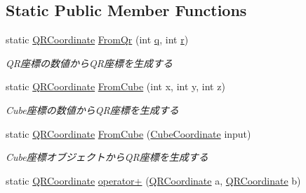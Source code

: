 \subsection*{Static Public Member Functions}
\begin{DoxyCompactItemize}
\item 
static \mbox{\hyperlink{struct_hexagonal_map_1_1_domain_1_1_hex_map_1_1_q_r_coordinate}{Q\+R\+Coordinate}} \mbox{\hyperlink{struct_hexagonal_map_1_1_domain_1_1_hex_map_1_1_q_r_coordinate_a25a176d46902a8375cb037c2220a886d}{From\+Qr}} (int \mbox{\hyperlink{struct_hexagonal_map_1_1_domain_1_1_hex_map_1_1_q_r_coordinate_a2a72acf6695756016491fed0cb909278}{q}}, int \mbox{\hyperlink{struct_hexagonal_map_1_1_domain_1_1_hex_map_1_1_q_r_coordinate_a8e28e052a706b934419932f039c3b973}{r}})
\begin{DoxyCompactList}\small\item\em Q\+R座標の数値から\+Q\+R座標を生成する \end{DoxyCompactList}\item 
static \mbox{\hyperlink{struct_hexagonal_map_1_1_domain_1_1_hex_map_1_1_q_r_coordinate}{Q\+R\+Coordinate}} \mbox{\hyperlink{struct_hexagonal_map_1_1_domain_1_1_hex_map_1_1_q_r_coordinate_a132ea4db8499914df5290d298b685b55}{From\+Cube}} (int x, int y, int z)
\begin{DoxyCompactList}\small\item\em Cube座標の数値から\+Q\+R座標を生成する \end{DoxyCompactList}\item 
static \mbox{\hyperlink{struct_hexagonal_map_1_1_domain_1_1_hex_map_1_1_q_r_coordinate}{Q\+R\+Coordinate}} \mbox{\hyperlink{struct_hexagonal_map_1_1_domain_1_1_hex_map_1_1_q_r_coordinate_ab30ad4d833840a3ecae1321d8209fe5b}{From\+Cube}} (\mbox{\hyperlink{struct_hexagonal_map_1_1_domain_1_1_hex_map_1_1_cube_coordinate}{Cube\+Coordinate}} input)
\begin{DoxyCompactList}\small\item\em Cube座標オブジェクトから\+Q\+R座標を生成する \end{DoxyCompactList}\item 
static \mbox{\hyperlink{struct_hexagonal_map_1_1_domain_1_1_hex_map_1_1_q_r_coordinate}{Q\+R\+Coordinate}} \mbox{\hyperlink{struct_hexagonal_map_1_1_domain_1_1_hex_map_1_1_q_r_coordinate_aa00285207f03d8178e4c6905ef96277b}{operator+}} (\mbox{\hyperlink{struct_hexagonal_map_1_1_domain_1_1_hex_map_1_1_q_r_coordinate}{Q\+R\+Coordinate}} a, \mbox{\hyperlink{struct_hexagonal_map_1_1_domain_1_1_hex_map_1_1_q_r_coordinate}{Q\+R\+Coordinate}} b)

\end{DoxyCompactItemize}
